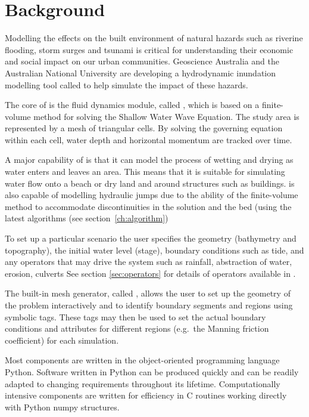 \documentclass{manual}
\begin{document}
\pagebreak


\section{Background}

Modelling the effects on the built environment of natural hazards such
as riverine flooding, storm surges and tsunami is critical for
understanding their economic and social impact on our urban
communities.  Geoscience Australia and the Australian National
University are developing a hydrodynamic inundation modelling tool
called \anuga to help simulate the impact of these hazards.

The core of \anuga is the fluid dynamics module, called ,
which is based on a finite-volume method for solving the Shallow Water
Wave Equation.  The study area is represented by a mesh of triangular
cells.  By solving the governing equation within each cell, water
depth and horizontal momentum are tracked over time.

A major capability of \anuga is that it can model the process of
wetting and drying as water enters and leaves an area.  This means
that it is suitable for simulating water flow onto a beach or dry land
and around structures such as buildings.  \anuga is also capable
of modelling hydraulic jumps due to the ability of the finite-volume
method to accommodate discontinuities in the solution and the bed (using the 
latest algorithms (see section~\ref{ch:algorithm})

To set up a particular scenario the user specifies the geometry
(bathymetry and topography), the initial water level (stage),
boundary conditions such as tide, and any operators  that may
drive the system such as rainfall, abstraction of water,  erosion, culverts
See section \ref{sec:operators} for details of operators available in \anuga.

The built-in mesh generator, called ,
allows the user to set up the geometry
of the problem interactively and to identify boundary segments and
regions using symbolic tags.  These tags may then be used to set the
actual boundary conditions and attributes for different regions
(e.g.\ the Manning friction coefficient) for each simulation.

Most \anuga components are written in the object-oriented programming
language Python.  Software written in Python can be produced quickly
and can be readily adapted to changing requirements throughout its
lifetime.  Computationally intensive components are written for
efficiency in C routines working directly with Python numpy
structures.  
\end{document}
